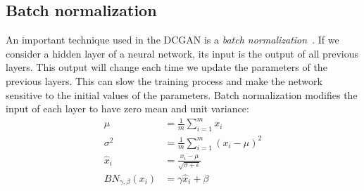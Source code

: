 \subsection{Batch normalization}
An important technique used in the DCGAN is a \textit{batch normalization}~\cite{batch_norm}. If we consider a hidden layer of a neural network, its input is the output of all previous layers. This output will change each time we update the parameters of the previous layers. This can slow the training process and make the network sensitive to the initial values of the parameters. Batch normalization modifies the input of each layer to have zero mean and unit variance: 
\begin{align*}
	\mu &= \frac{1}{m} \sum_{i=1}^{m}x_i \\
	\sigma^2 &= \frac{1}{m} \sum_{i=1}^{m}(x_i - \mu)^2 \\
	\hat{x}_i &= \frac{x_i - \mu}{\sqrt{\sigma+\epsilon}} \\
	BN_{\gamma, \beta}(x_i) &= \gamma \hat{x}_i + \beta
\end{align*}